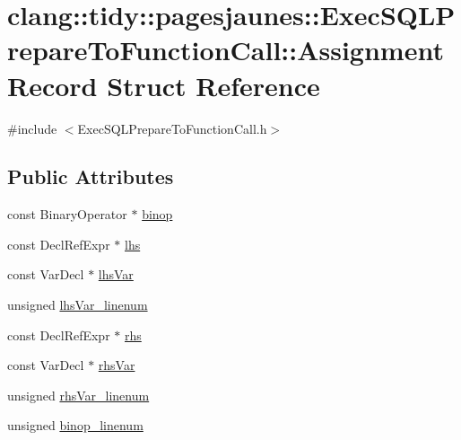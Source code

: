 \hypertarget{structclang_1_1tidy_1_1pagesjaunes_1_1_exec_s_q_l_prepare_to_function_call_1_1_assignment_record}{}\section{clang\+:\+:tidy\+:\+:pagesjaunes\+:\+:Exec\+S\+Q\+L\+Prepare\+To\+Function\+Call\+:\+:Assignment\+Record Struct Reference}
\label{structclang_1_1tidy_1_1pagesjaunes_1_1_exec_s_q_l_prepare_to_function_call_1_1_assignment_record}


{\ttfamily \#include $<$Exec\+S\+Q\+L\+Prepare\+To\+Function\+Call.\+h$>$}

\subsection*{Public Attributes}
\begin{DoxyCompactItemize}
\item 
const Binary\+Operator $\ast$ \hyperlink{structclang_1_1tidy_1_1pagesjaunes_1_1_exec_s_q_l_prepare_to_function_call_1_1_assignment_record_a3a39037e6cc13f5ce64687a44b4dfa71}{binop}
\item 
const Decl\+Ref\+Expr $\ast$ \hyperlink{structclang_1_1tidy_1_1pagesjaunes_1_1_exec_s_q_l_prepare_to_function_call_1_1_assignment_record_a478ce93daf4c12300ef0e3864980b186}{lhs}
\item 
const Var\+Decl $\ast$ \hyperlink{structclang_1_1tidy_1_1pagesjaunes_1_1_exec_s_q_l_prepare_to_function_call_1_1_assignment_record_a8c30bb2fcd2571d63b105e5d991469ca}{lhs\+Var}
\item 
unsigned \hyperlink{structclang_1_1tidy_1_1pagesjaunes_1_1_exec_s_q_l_prepare_to_function_call_1_1_assignment_record_ad6fa2636fe4d5ed44a1f3a10c8a8acd4}{lhs\+Var\+\_\+linenum}
\item 
const Decl\+Ref\+Expr $\ast$ \hyperlink{structclang_1_1tidy_1_1pagesjaunes_1_1_exec_s_q_l_prepare_to_function_call_1_1_assignment_record_ac7d7aaf170b6c189fcf65c682f8376d2}{rhs}
\item 
const Var\+Decl $\ast$ \hyperlink{structclang_1_1tidy_1_1pagesjaunes_1_1_exec_s_q_l_prepare_to_function_call_1_1_assignment_record_ac819a32e7bffb95c207cd5bb5e3022ba}{rhs\+Var}
\item 
unsigned \hyperlink{structclang_1_1tidy_1_1pagesjaunes_1_1_exec_s_q_l_prepare_to_function_call_1_1_assignment_record_aaaf09170a4ac7684480e4abd74debe9f}{rhs\+Var\+\_\+linenum}
\item 
unsigned \hyperlink{structclang_1_1tidy_1_1pagesjaunes_1_1_exec_s_q_l_prepare_to_function_call_1_1_assignment_record_a9276061f99def9e00850987657a919ea}{binop\+\_\+linenum}
\end{DoxyCompactItemize}



